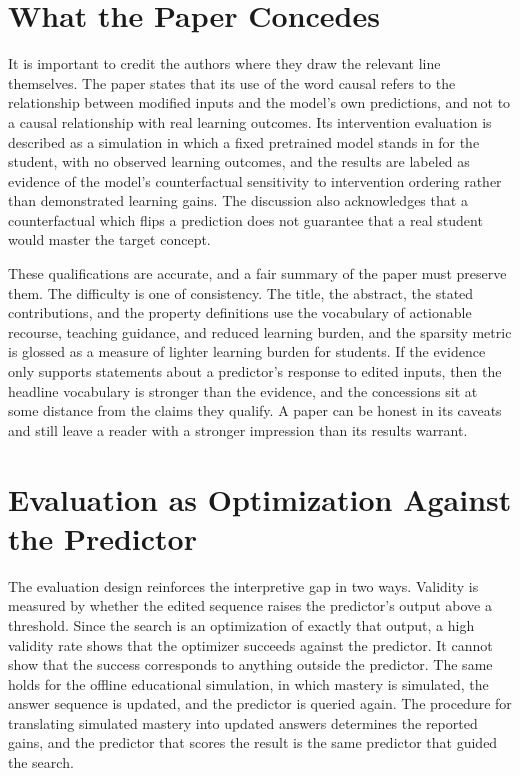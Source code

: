 \documentclass[11pt]{article}
\begin{document}
\section{What the Paper Concedes}

It is important to credit the authors where they draw the relevant line themselves. The paper states that its use of the word causal refers to the relationship between modified inputs and the model's own predictions, and not to a causal relationship with real learning outcomes. Its intervention evaluation is described as a simulation in which a fixed pretrained model stands in for the student, with no observed learning outcomes, and the results are labeled as evidence of the model's counterfactual sensitivity to intervention ordering rather than demonstrated learning gains. The discussion also acknowledges that a counterfactual which flips a prediction does not guarantee that a real student would master the target concept.

These qualifications are accurate, and a fair summary of the paper must preserve them. The difficulty is one of consistency. The title, the abstract, the stated contributions, and the property definitions use the vocabulary of actionable recourse, teaching guidance, and reduced learning burden, and the sparsity metric is glossed as a measure of lighter learning burden for students. If the evidence only supports statements about a predictor's response to edited inputs, then the headline vocabulary is stronger than the evidence, and the concessions sit at some distance from the claims they qualify. A paper can be honest in its caveats and still leave a reader with a stronger impression than its results warrant.

\section{Evaluation as Optimization Against the Predictor}

The evaluation design reinforces the interpretive gap in two ways. Validity is measured by whether the edited sequence raises the predictor's output above a threshold. Since the search is an optimization of exactly that output, a high validity rate shows that the optimizer succeeds against the predictor. It cannot show that the success corresponds to anything outside the predictor. The same holds for the offline educational simulation, in which mastery is simulated, the answer sequence is updated, and the predictor is queried again. The procedure for translating simulated mastery into updated answers determines the reported gains, and the predictor that scores the result is the same predictor that guided the search.
\end{document}
